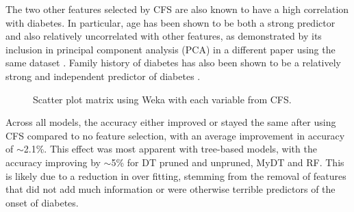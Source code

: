 The two other features selected by CFS are also known to have a high correlation with diabetes. In particular, age has been shown to be both a strong predictor \cite{i} and also relatively uncorrelated with other features, as demonstrated by its inclusion in principal component analysis (PCA) in a different paper using the same dataset \cite{c}. Family history of diabetes has also been shown to be a relatively strong and independent predictor of diabetes \cite{j}. \\

\begin{figure}[htp] 
\caption{Scatter plot matrix using Weka with each variable from CFS.\label{fig:corr}}
\end{figure}


Across all models, the accuracy either improved or stayed the same after using CFS compared to no feature selection, with an average improvement in accuracy of $\sim$2.1\%. This effect was most apparent with tree-based models, with the accuracy improving by $\sim$5\% for DT pruned and unpruned, MyDT and RF. This is likely due to a reduction in over fitting, stemming from the removal of features that did not add much information or were otherwise terrible predictors of the onset of diabetes.

